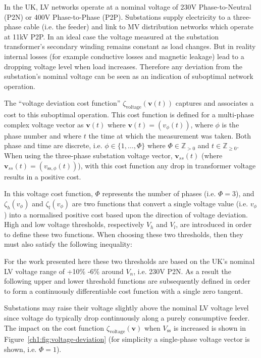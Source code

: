 In the UK, LV networks operate at a nominal voltage of 230V Phase-to-Neutral (P2N) or 400V Phase-to-Phase (P2P).
Substations supply electricity to a three-phase cable (i.e. the feeder) and link to MV distribution networks which operate at 11kV P2P.
In an ideal case the voltage measured at the substation transformer's secondary winding remains constant as load changes.
But in reality internal losses (for example conductive losses and magnetic leakage) lead to a dropping voltage level when load increases.
Therefore any deviation from the substation's nominal voltage can be seen as an indication of suboptimal network operation.

The ``voltage deviation cost function'' $\zeta_\text{voltage}(\textbf{v}(t))$ captures and associates a cost to this suboptimal operation.
This cost function is defined for a multi-phase complex voltage vector as $\textbf{v}(t)$ where $\textbf{v}(t) = (v_\phi(t))$, where $\phi$ is the phase number and where $t$ the time at which the measurement was taken.
Both phase and time are discrete, i.e. $\phi \in \{1,\dots,\Phi\}$ where $\Phi \in \mathbb{Z}_{>0}$ and $t \in \mathbb{Z}_{\geq0}$.
When using the three-phase substation voltage vector, $\textbf{v}_{ss}(t)$ (where $\textbf{v}_{ss}(t) = (v_{\text{ss},\phi}(t))$), with this cost function any drop in transformer voltage results in a positive cost.



In this voltage cost function, $\Phi$ represents the number of phases (i.e. $\Phi = 3$), and $\zeta_h(v_\phi)$ and $\zeta_l(v_\phi)$ are two functions that convert a single voltage value (i.e. $v_\phi$) into a normalised positive cost based upon the direction of voltage deviation.
High and low voltage thresholds, respectively $V_h$ and $V_l$, are introduced in order to define these two functions.
When choosing these two thresholds, then they must also satisfy the following inequality:



For the work presented here these two thresholds are based on the UK's nominal LV voltage range of +10\% -6\% around $V_n$, i.e. 230V P2N.
As a result the following upper and lower threshold functions are subsequently defined in order to form a continuously differentiable cost function with a single zero tangent.



Substations may raise their voltage slightly above the nominal LV voltage level since voltage do typically drop continuously along a purely consumptive feeder.
The impact on the cost function $\zeta_\text{voltage}(\textbf{v})$ when $V_\text{ss}$ is increased is shown in Figure~\ref{ch1:fig:voltage-deviation} (for simplicity a single-phase voltage vector is shown, i.e. $\Phi = 1$).

